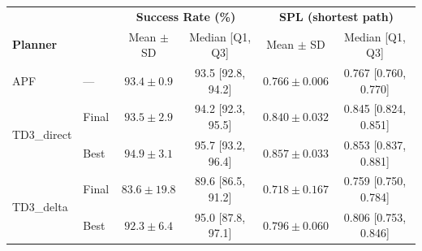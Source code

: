 \begin{tabular}{ll|cc|cc}
\midrule[1.5pt]
 & & \multicolumn{2}{c|}{\textbf{Success Rate (\%)}} & \multicolumn{2}{c}{\textbf{SPL (shortest path)}} \\
\textbf{Planner} & \textbf{} & Mean $\pm$ SD & Median [Q1, Q3] & Mean $\pm$ SD & Median [Q1, Q3] \\
\midrule[1.5pt]
APF & --- & $93.4 \pm 0.9$ & 93.5 [92.8, 94.2] & $0.766 \pm 0.006$ & 0.767 [0.760, 0.770] \\
\midrule
\multirow{2}{*}{TD3\_direct} & Final & $93.5 \pm 2.9$ & 94.2 [92.3, 95.5] & $0.840 \pm 0.032$ & 0.845 [0.824, 0.851] \\
                             & Best  & $94.9 \pm 3.1$ & 95.7 [93.2, 96.4] & $0.857 \pm 0.033$ & 0.853 [0.837, 0.881] \\
\midrule
\multirow{2}{*}{TD3\_delta}  & Final & $83.6 \pm 19.8$ & 89.6 [86.5, 91.2] & $0.718 \pm 0.167$ & 0.759 [0.750, 0.784] \\
                             & Best  & $92.3 \pm 6.4$ & 95.0 [87.8, 97.1] & $0.796 \pm 0.060$ & 0.806 [0.753, 0.846] \\
\midrule[1.5pt]
\end{tabular}
